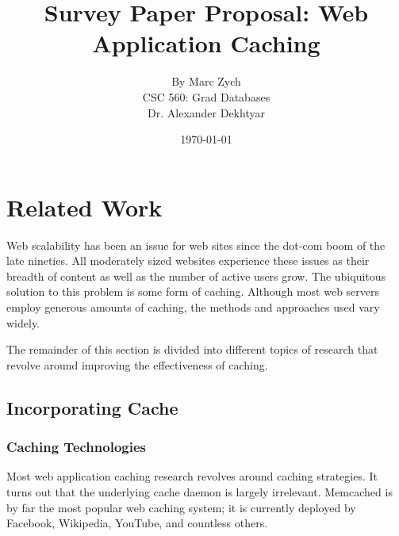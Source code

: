 \documentclass[12pt]{article}
\begin{document}
\title{\vfill Survey Paper Proposal: Web Application Caching}

\author{
By Marc Zych \vspace{10pt} \\
CSC 560: Grad Databases \vspace{10pt} \\
Dr. Alexander Dekhtyar \vspace{10pt} \\
}
\date{\today}

\maketitle


\thispagestyle{empty}
\newpage



\section{Related Work}
Web scalability has been an issue for web sites since the dot-com boom of the late nineties.
All moderately sized websites experience these issues as their breadth of content as well as the number of active users grow.
The ubiquitous solution to this problem is some form of caching.
Although most web servers employ generous amounts of caching, the methods and approaches used vary widely.

The remainder of this section is divided into different topics of research that revolve around improving the effectiveness of caching.

\subsection{Incorporating Cache}
\subsubsection{Caching Technologies}
Most web application caching research revolves around caching strategies.
It turns out that the underlying cache daemon is largely irrelevant.
Memcached is by far the most popular web caching system; it is currently deployed by Facebook, Wikipedia, YouTube, and countless others.\cite{memcachedDotOrg}
\end{document}
